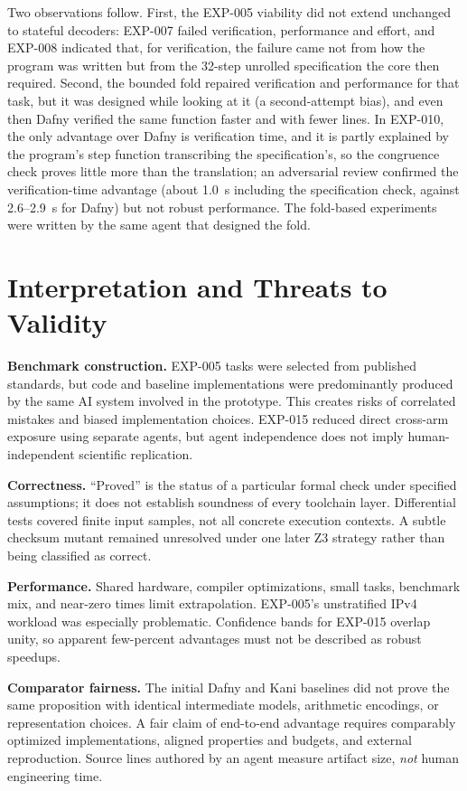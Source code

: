 \documentclass[10pt,twocolumn]{article}
\begin{document}
Two observations follow. First, the EXP-005 viability did not extend unchanged to stateful decoders: EXP-007 failed verification, performance and effort, and EXP-008 indicated that, for verification, the failure came not from how the program was written but from the 32-step unrolled specification the core then required. Second, the bounded fold repaired verification and performance for that task, but it was designed while looking at it (a second-attempt bias), and even then Dafny verified the same function faster and with fewer lines. In EXP-010, the only advantage over Dafny is verification time, and it is partly explained by the program's step function transcribing the specification's, so the congruence check proves little more than the translation; an adversarial review confirmed the verification-time advantage (about 1.0~s including the specification check, against 2.6--2.9~s for Dafny) but not robust performance. The fold-based experiments were written by the same agent that designed the fold.

\section{Interpretation and Threats to Validity}
\textbf{Benchmark construction.} EXP-005 tasks were selected from published standards, but code and baseline implementations were predominantly produced by the same AI system involved in the prototype. This creates risks of correlated mistakes and biased implementation choices. EXP-015 reduced direct cross-arm exposure using separate agents, but agent independence does not imply human-independent scientific replication.

\textbf{Correctness.} ``Proved'' is the status of a particular formal check under specified assumptions; it does not establish soundness of every toolchain layer. Differential tests covered finite input samples, not all concrete execution contexts. A subtle checksum mutant remained unresolved under one later Z3 strategy rather than being classified as correct.

\textbf{Performance.} Shared hardware, compiler optimizations, small tasks, benchmark mix, and near-zero times limit extrapolation. EXP-005's unstratified IPv4 workload was especially problematic. Confidence bands for EXP-015 overlap unity, so apparent few-percent advantages must not be described as robust speedups.

\textbf{Comparator fairness.} The initial Dafny and Kani baselines did not prove the same proposition with identical intermediate models, arithmetic encodings, or representation choices. A fair claim of end-to-end advantage requires comparably optimized implementations, aligned properties and budgets, and external reproduction. Source lines authored by an agent measure artifact size, \emph{not} human engineering time.
\end{document}
